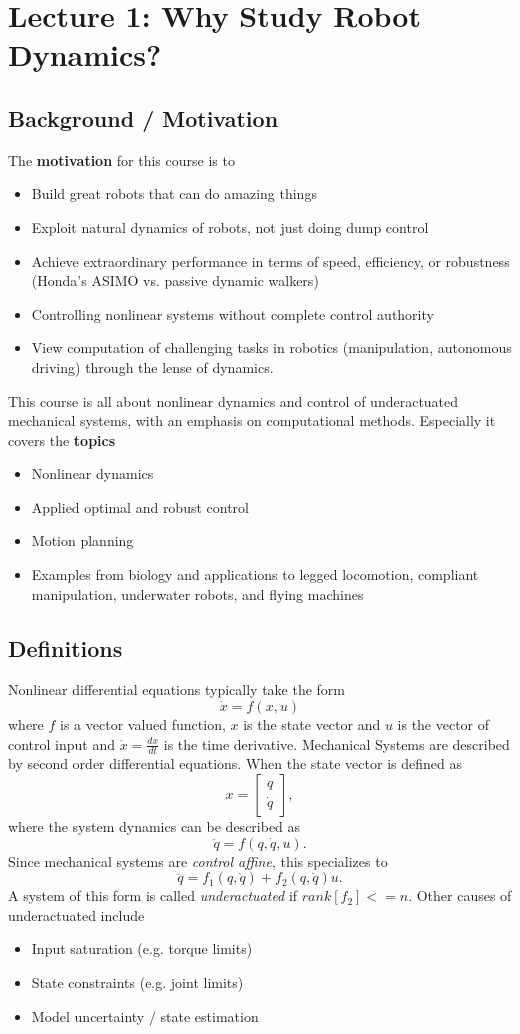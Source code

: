 \chapter{Lecture 1: Why Study Robot Dynamics?}\label{lecture1}
\section{Background / Motivation}
The \textbf{motivation} for this course is to
\begin{itemize}
\item Build great robots that can do amazing things
\item Exploit natural dynamics of robots, not just doing dump control
\item Achieve extraordinary performance in terms of speed, efficiency, or robustness (Honda's ASIMO vs. passive dynamic walkers)
\item Controlling nonlinear systems without complete control authority
\item View computation of challenging tasks in robotics (manipulation, autonomous driving) through the lense of dynamics.
\end{itemize}
This course is all about nonlinear dynamics and control of underactuated mechanical systems, with an emphasis on computational methods. Especially it covers the \textbf{topics}
\begin{itemize}
\item Nonlinear dynamics
\item Applied optimal and robust control
\item Motion planning
\item Examples from biology and applications to legged locomotion, compliant manipulation, underwater robots, and flying machines
\end{itemize}

\section{Definitions}
Nonlinear differential equations typically take the form
$$ \dot{x} = f(x,u) $$
where $f$ is a vector valued function, $x$ is the state vector and $u$ is the vector of control input and $\dot{x}=\frac{dx}{dt}$ is the time derivative.
Mechanical Systems are described by second order differential equations. When the state vector is defined as 
$$x=\begin{bmatrix}q \\ \dot{q}\end{bmatrix},$$ 
where the system dynamics can be described as
$$\ddot{q}=f(q,\dot{q}, u).$$
Since mechanical systems are \textit{control affine}, this specializes to
$$ \ddot{q}=f_{1}(q,\dot{q})+f_{2}(q,\dot{q})u.$$
A system of this form is called \textit{underactuated} if $rank[f_{2}]<=n$. 
Other causes of underactuated include
\begin{itemize}
\item Input saturation (e.g. torque limits)
\item State constraints (e.g. joint limits)
\item Model uncertainty / state estimation
\end{itemize}
 
